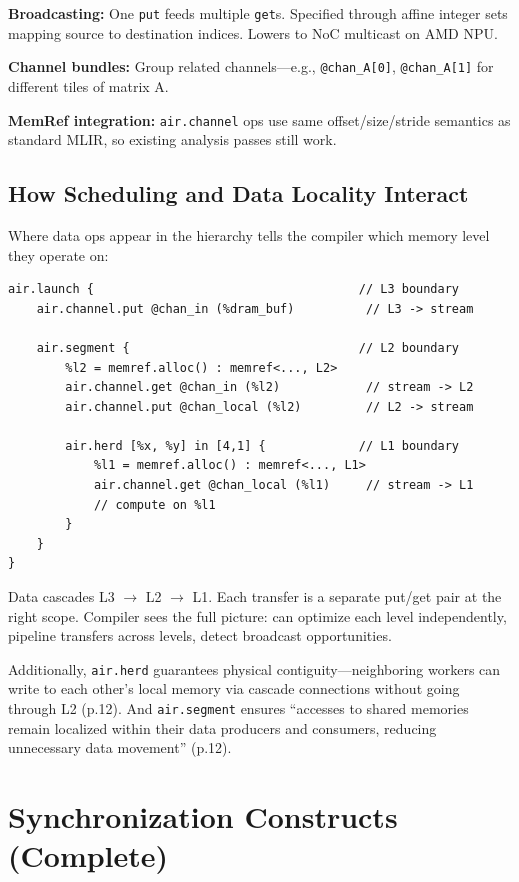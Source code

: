 \documentclass[11pt,a4paper]{article}
\begin{document}
\textbf{Broadcasting:} One \texttt{put} feeds multiple \texttt{get}s. Specified
through affine integer sets mapping source to destination indices. Lowers to NoC
multicast on AMD NPU.

\textbf{Channel bundles:} Group related channels---e.g.,
\texttt{@chan\_A[0]}, \texttt{@chan\_A[1]} for different tiles of matrix A.

\textbf{MemRef integration:} \texttt{air.channel} ops use same offset/size/stride
semantics as standard MLIR, so existing analysis passes still work.

\subsection{How Scheduling and Data Locality Interact}

Where data ops appear in the hierarchy tells the compiler which memory level they
operate on:

\begin{lstlisting}
air.launch {                                     // L3 boundary
    air.channel.put @chan_in (%dram_buf)          // L3 -> stream

    air.segment {                                // L2 boundary
        %l2 = memref.alloc() : memref<..., L2>
        air.channel.get @chan_in (%l2)            // stream -> L2
        air.channel.put @chan_local (%l2)         // L2 -> stream

        air.herd [%x, %y] in [4,1] {             // L1 boundary
            %l1 = memref.alloc() : memref<..., L1>
            air.channel.get @chan_local (%l1)     // stream -> L1
            // compute on %l1
        }
    }
}
\end{lstlisting}

Data cascades L3 $\rightarrow$ L2 $\rightarrow$ L1. Each transfer is a separate
put/get pair at the right scope. Compiler sees the full picture: can optimize each
level independently, pipeline transfers across levels, detect broadcast opportunities.

Additionally, \texttt{air.herd} guarantees physical contiguity---neighboring workers
can write to each other's local memory via cascade connections without going through
L2 (p.12). And \texttt{air.segment} ensures ``accesses to shared memories remain
localized within their data producers and consumers, reducing unnecessary data
movement'' (p.12).


\section{Synchronization Constructs (Complete)}
\end{document}
